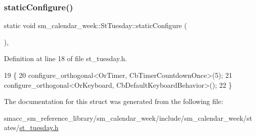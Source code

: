\subsubsection{\texorpdfstring{static\+Configure()}{staticConfigure()}}
{\footnotesize\ttfamily static void sm\+\_\+calendar\+\_\+week\+::\+St\+Tuesday\+::static\+Configure (\begin{DoxyParamCaption}{ }\end{DoxyParamCaption})\hspace{0.3cm}{\ttfamily [inline]}, {\ttfamily [static]}}



Definition at line 18 of file st\+\_\+tuesday.\+h.


\begin{DoxyCode}
19     \{
20         configure\_orthogonal<OrTimer, CbTimerCountdownOnce>(5);   
21         configure\_orthogonal<OrKeyboard, CbDefaultKeyboardBehavior>();
22     \}
\end{DoxyCode}


The documentation for this struct was generated from the following file\+:\begin{DoxyCompactItemize}
\item 
smacc\+\_\+sm\+\_\+reference\+\_\+library/sm\+\_\+calendar\+\_\+week/include/sm\+\_\+calendar\+\_\+week/states/\hyperlink{st__tuesday_8h}{st\+\_\+tuesday.\+h}\end{DoxyCompactItemize}
